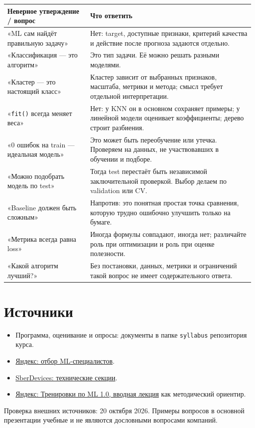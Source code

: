 \documentclass[11pt,a4paper]{article}
\begin{document}
{\small\begin{longtable}{@{}P{52mm}P{105mm}@{}}
\toprule
Неверное утверждение / вопрос & Что ответить\\
\midrule
\endhead
«ML сам найдёт правильную задачу» & Нет: target, доступные признаки, критерий качества и действие после прогноза задаются отдельно.\\
«Классификация --- это алгоритм» & Это тип задачи. Её можно решать разными моделями.\\
«Кластер --- это настоящий класс» & Кластер зависит от выбранных признаков, масштаба, метрики и метода; смысл требует отдельной интерпретации.\\
«\texttt{fit()} всегда меняет веса» & Нет: у KNN он в основном сохраняет примеры; у линейной модели оценивает коэффициенты; дерево строит разбиения.\\
«0 ошибок на train --- идеальная модель» & Это может быть переобучение или утечка. Проверяем на данных, не участвовавших в обучении и подборе.\\
«Можно подобрать модель по test» & Тогда test перестаёт быть независимой заключительной проверкой. Выбор делаем по validation или CV.\\
«Baseline должен быть сложным» & Напротив: это понятная простая точка сравнения, которую трудно ошибочно улучшить только на бумаге.\\
«Метрика всегда равна loss» & Иногда формулы совпадают, иногда нет; различайте роль при оптимизации и роль при оценке полезности.\\
«Какой алгоритм лучший?» & Без постановки, данных, метрики и ограничений такой вопрос не имеет содержательного ответа.\\
\bottomrule
\end{longtable}}

\section{Источники}
\begin{itemize}
\item Программа, оценивание и опросы: документы в папке \texttt{syllabus} репозитория курса.
\item \href{https://yandex.ru/jobs/interview/mldev?turbo=true}{Яндекс: отбор ML-специалистов}.
\item \href{https://sberdevices.ru/career/ML/interview/}{SberDevices: технические секции}.
\item \href{https://www.youtube.com/watch?v=k3UJOG-DKHE}{Яндекс: Тренировки по ML 1.0, вводная лекция} как методический ориентир.
\end{itemize}
Проверка внешних источников: 20 октября 2026. Примеры вопросов в основной презентации учебные и не являются дословными вопросами компаний.
\end{document}
